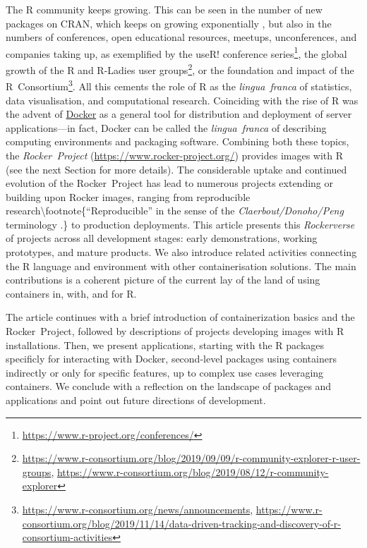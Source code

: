 The R community keeps growing. This can be seen in the number of new
packages on CRAN, which keeps on growing exponentially
\citep{cran:2019}, but also in the numbers of conferences, open
educational resources, meetups, unconferences, and companies taking up,
as exemplified by the useR! conference
series\footnote{\href{https://www.r-project.org/conferences/}{https://www.r-project.org/conferences/}},
the global growth of the R and R-Ladies user
groups\footnote{\href{https://www.r-consortium.org/blog/2019/09/09/r-community-explorer-r-user-groups}{https://www.r-consortium.org/blog/2019/09/09/r-community-explorer-r-user-groups}, \href{https://www.r-consortium.org/blog/2019/08/12/r-community-explorer}{https://www.r-consortium.org/blog/2019/08/12/r-community-explorer}},
or the foundation and impact of the
R~Consortium\footnote{\href{https://www.r-consortium.org/news/announcements}{https://www.r-consortium.org/news/announcements}, \href{https://www.r-consortium.org/blog/2019/11/14/data-driven-tracking-and-discovery-of-r-consortium-activities}{https://www.r-consortium.org/blog/2019/11/14/data-driven-tracking-and-discovery-of-r-consortium-activities}}.
All this cements the role of R as the \emph{lingua~franca} of
statistics, data visualisation, and computational research. Coinciding
with the rise of R was the advent of
\href{https://en.wikipedia.org/wiki/Docker_(software)}{Docker} as a
general tool for distribution and deployment of server applications---in
fact, Docker can be called the \emph{lingua~franca} of describing
computing environments and packaging software. Combining both these
topics, the \emph{Rocker~Project}
(\url{https://www.rocker-project.org/}) provides images with R (see the
next Section for more details). The considerable uptake and continued
evolution of the Rocker~Project has lead to numerous projects extending
or building upon Rocker images, ranging from reproducible
research\textbackslash{}footnote\{``Reproducible'' in the sense of the
\emph{Claerbout/Donoho/Peng} terminology
\citep{barba_terminologies_2018}.\} to production deployments. This
article presents this \emph{Rockerverse} of projects across all
development stages: early demonstrations, working prototypes, and mature
products. We also introduce related activities connecting the R language
and environment with other containerisation solutions. The main
contributions is a coherent picture of the current lay of the land of
using containers in, with, and for R.

The article continues with a brief introduction of containerization
basics and the Rocker~Project, followed by descriptions of projects
developing images with R installations. Then, we present applications,
starting with the R packages specificly for interacting with Docker,
second-level packages using containers indirectly or only for specific
features, up to complex use cases leveraging containers. We conclude
with a reflection on the landscape of packages and applications and
point out future directions of development.

